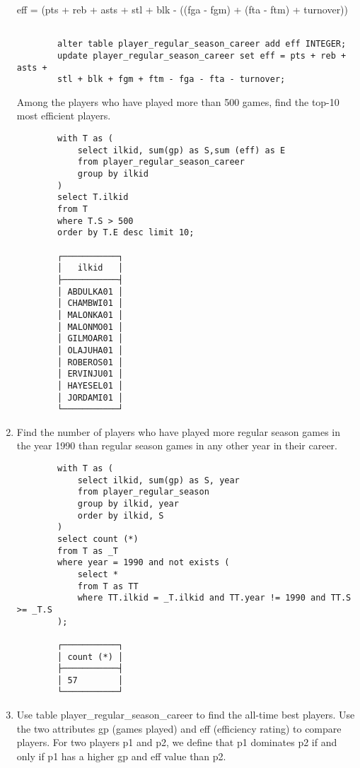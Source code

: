 \documentclass[12pt]{amsart}   	%
\begin{document}
\begin{enumerate}
        	eff = (pts + reb + asts + stl + blk - ((fga - fgm) + (fta - ftm) + turnover))
        
        \begin{verbatim}
            
        alter table player_regular_season_career add eff INTEGER;
        update player_regular_season_career set eff = pts + reb + asts + 
        stl + blk + fgm + ftm - fga - fta - turnover;
        \end{verbatim}
        
        Among the players who have played more than 500 games, find the top-10 most efficient players. 
        
        \begin{verbatim}
        with T as (
            select ilkid, sum(gp) as S,sum (eff) as E
            from player_regular_season_career 
            group by ilkid
        )
        select T.ilkid 
        from T 
        where T.S > 500 
        order by T.E desc limit 10;
        
        ┌───────────┐
        │   ilkid   │
        ├───────────┤
        │ ABDULKA01 │
        │ CHAMBWI01 │
        │ MALONKA01 │
        │ MALONMO01 │
        │ GILMOAR01 │
        │ OLAJUHA01 │
        │ ROBEROS01 │
        │ ERVINJU01 │
        │ HAYESEL01 │
        │ JORDAMI01 │
        └───────────┘
        \end{verbatim} 
        
        
        \item Find the number of players who have played more regular season games in the year 1990 than regular season games in any other year in their career. 
        
        \begin{verbatim}
        with T as (
            select ilkid, sum(gp) as S, year 
            from player_regular_season 
            group by ilkid, year 
            order by ilkid, S
        )
        select count (*) 
        from T as _T 
        where year = 1990 and not exists (
            select * 
            from T as TT 
            where TT.ilkid = _T.ilkid and TT.year != 1990 and TT.S >= _T.S
        );
        
        ┌───────────┐
        │ count (*) │
        ├───────────┤
        │ 57        │
        └───────────┘
        \end{verbatim}
        
        \item Use table player\_regular\_season\_career to find the all-time best players. Use the two attributes gp (games played) and eff (efficiency rating) to compare players. For two players p1 and p2, we define that p1 dominates p2 if and only if p1 has a higher gp and eff value than p2.
        

\end{enumerate}
\end{document}
